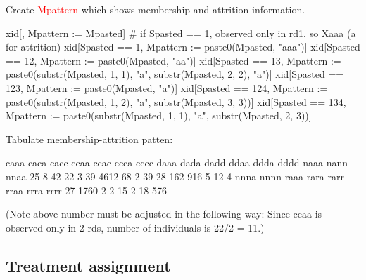 Create \textcolor{red}{\textsf{Mpattern}} which shows membership and attrition information.
\begin{Schunk}
\begin{Sinput}
xid[, Mpattern := Mpasted]
# if Spasted == 1, observed only in rd1, so Xaaa (a for attrition)
xid[Spasted == 1, Mpattern := paste0(Mpasted, "aaa")]
xid[Spasted == 12, Mpattern := paste0(Mpasted, "aa")]
xid[Spasted == 13, Mpattern := paste0(substr(Mpasted, 1, 1), "a", 
	substr(Mpasted, 2, 2), "a")]
xid[Spasted == 123, Mpattern := paste0(Mpasted, "a")]
xid[Spasted == 124, Mpattern := paste0(substr(Mpasted, 1, 2), "a", 
	substr(Mpasted, 3, 3))]
xid[Spasted == 134, Mpattern := paste0(substr(Mpasted, 1, 1), "a", 
	substr(Mpasted, 2, 3))]
\end{Sinput}
\end{Schunk}
Tabulate membership-attrition patten:
\begin{Schunk}
\begin{Soutput}

caaa caca cacc ccaa ccac ccca cccc daaa dada dadd ddaa ddda dddd naaa nann nnaa 
  25    8   42   22    3   39 4612   68    2   39   28  162  916    5   12    4 
nnna nnnn raaa rara rarr rraa rrra rrrr 
  27 1760    2    2   15    2   18  576 
\end{Soutput}
\end{Schunk}
(Note above number must be adjusted in the following way: Since \textsf{ccaa} is observed only in 2 rds, number of individuals is 22/2 = 11.)



\subsection{Treatment assignment}

